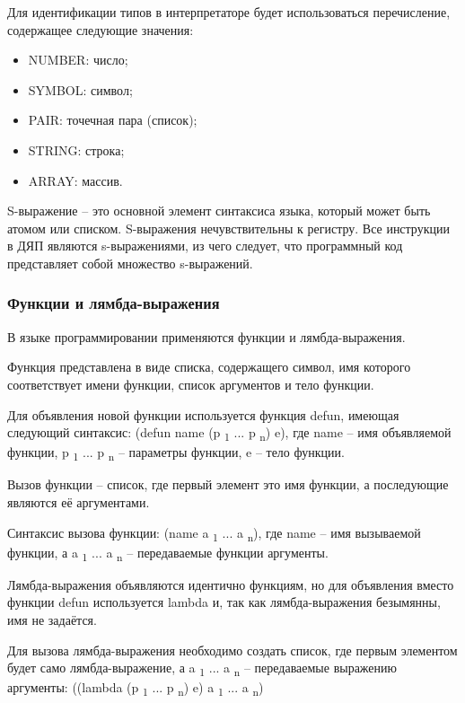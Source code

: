 Для идентификации типов в интерпретаторе будет использоваться перечисление, содержащее следующие значения:
\begin{itemize}
	\item NUMBER: число;
	\item SYMBOL: символ;
	\item PAIR: точечная пара (список);
	\item STRING: строка;
	\item ARRAY: массив.
\end{itemize}

S-выражение -- это основной элемент синтаксиса языка, который может быть атомом или списком. S-выражения нечувствительны к регистру. Все инструкции в ДЯП являются s-выражениями, из чего следует, что программный код представляет собой множество s-выражений.

\subsubsection{Функции и лямбда-выражения}

В языке программировании применяются функции и лямбда-выражения.

Функция представлена в виде списка, содержащего символ, имя которого соответствует имени функции, список аргументов и тело функции.

Для объявления новой функции используется функция defun, имеющая следующий синтаксис:
(defun name (p \textsubscript 1 ... p \textsubscript n) e), где name -- имя объявляемой функции, p \textsubscript 1 ... p \textsubscript n -- параметры функции, e -- тело функции.

Вызов функции -- список, где первый элемент это имя функции, а последующие являются её аргументами.

Синтаксис вызова функции:
(name a \textsubscript 1 ... a \textsubscript n), где name -- имя вызываемой функции, а a \textsubscript 1 ... a \textsubscript n -- передаваемые функции аргументы.

Лямбда-выражения объявляются идентично функциям, но для объявления вместо функции defun используется lambda и, так как лямбда-выражения безымянны, имя не задаётся.

Для вызова лямбда-выражения необходимо создать список, где первым элементом будет само лямбда-выражение, а a \textsubscript 1 ... a \textsubscript n -- передаваемые выражению аргументы: 
((lambda (p \textsubscript 1 ... p \textsubscript n) e) a \textsubscript 1 ... a \textsubscript n)

